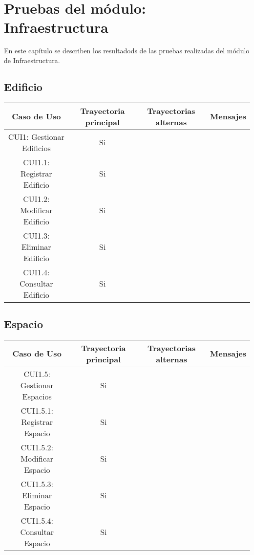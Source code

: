 \newpage

\section{Pruebas del módulo: Infraestructura} \label{chp:pruebasAcademias}
En este capítulo se describen los resultadods de las pruebas realizadas del módulo de Infraestructura.

\subsection{Edificio}
\begin{center}
	\begin{tabular}{ |c|c|c|c| } 
		\hline
		Caso de Uso & Trayectoria principal & Trayectorias alternas & Mensajes \\
		\hline 
		CUI1: Gestionar Edificios & Si &  & \\ 
		CUI1.1: Registrar Edificio & Si &  & \\ 
		CUI1.2: Modificar Edificio & Si &  & \\ 
		CUI1.3: Eliminar Edificio & Si &  & \\ 
		CUI1.4: Consultar Edificio & Si &  & \\ 
		\hline
	\end{tabular}
\end{center}

\subsection{Espacio}
\begin{center}
	\begin{tabular}{ |c|c|c|c| } 
		\hline
		Caso de Uso & Trayectoria principal & Trayectorias alternas & Mensajes \\
		\hline 
		CUI1.5: Gestionar Espacios & Si &  & \\ 
		CUI1.5.1: Registrar Espacio & Si &  & \\ 
		CUI1.5.2: Modificar Espacio & Si &  & \\ 
		CUI1.5.3: Eliminar Espacio & Si &  & \\ 
		CUI1.5.4: Consultar Espacio & Si &  & \\ 
		\hline
	\end{tabular}
\end{center}
